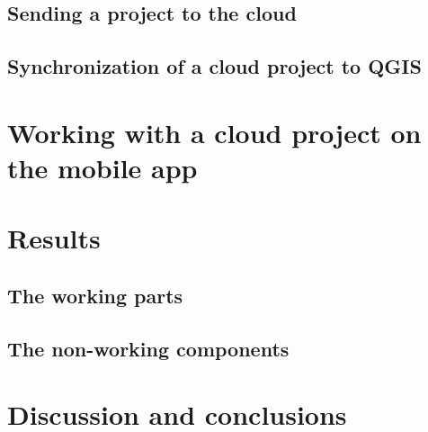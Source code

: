 \documentclass{article}
\begin{document}
\subsection{Sending a project to the cloud}

\subsection{Synchronization of a cloud project to QGIS}

\section{Working with a cloud project on the mobile app}

\section{Results}

\subsection{The working parts}

\subsection{The non-working components}

\section{Discussion and conclusions}



\end{document}
